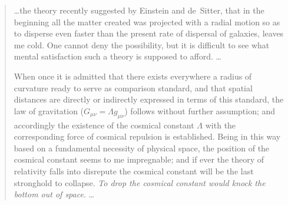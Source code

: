 \begin{quotation}
\ldots the theory recently suggested by Einstein and de~Sitter, that in the beginning all the matter created was projected with a radial motion so as to disperse even faster than the present rate of dispersal of galaxies, leaves me cold. One cannot deny the possibility, but it is difficult to see what mental satisfaction such a theory is supposed to afford. \ldots

When once it is admitted that there exists everywhere a radius of curvature ready to serve as comparison standard, and that spatial distances are directly or indirectly expressed in terms of this standard, the law of gravitation ($G_{\mu\nu}=\Lambda{g_{\mu\nu}}$) follows without further assumption; and accordingly the existence of the cosmical constant $\Lambda$ with the corresponding force of cosmical repulsion is established. Being in this way based on a fundamental necessity of physical space, the position of the cosmical constant seems to me impregnable; and if ever the theory of relativity falls into disrepute the cosmical constant will be the last stronghold to collapse. \textit{To drop the cosmical constant would knock the bottom out of space}. \ldots
\end{quotation}

